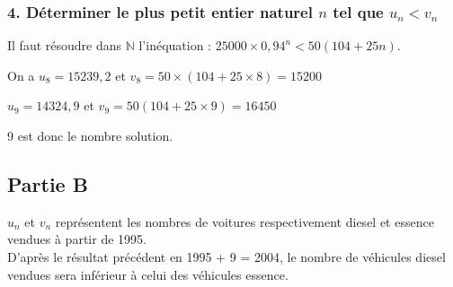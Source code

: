 \documentclass[10pt]{article}
\begin{document}
	\subsubsection*{4. Déterminer le plus petit entier naturel $n$ tel que $u_n < v_n$}
	
	Il faut résoudre dans $\mathbb{N}$ l’inéquation : $25000 \times 0,94^n < 50(104 + 25n)$.
	
	On a $u_8 = 15239,2$ et $v_8 = 50 \times (104 + 25 \times 8) = 15200$
	
	$u_9 = 14324,9$ et $v_9 = 50(104 + 25 \times 9) = 16450$
	
	9 est donc le nombre solution.
	
	\subsection*{Partie B}
	 $u_n$ et $v_n$ représentent les nombres de voitures respectivement diesel et essence vendues à partir de 1995.\\ D’après le résultat précédent en 1995 + 9 = 2004, le nombre de véhicules diesel vendues sera inférieur à celui des véhicules essence.
\end{document}
